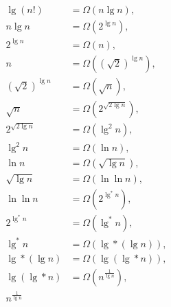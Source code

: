 \begin{align*}
	\lg (n!)  &= \Omega \left(n \lg n \right), \\
	n \lg n &= \Omega \left(2^{\lg n} \right), \\
	2^{\lg n} &= \Omega \left(n \right), \\
	n &= \Omega \left(\left( \sqrt{2} \right)^{\lg n} \right), \\
	\left( \sqrt{2} \right)^{\lg n} &= \Omega \left(\sqrt{n} \right), \\
	\sqrt{n} &= \Omega \left(2^{\sqrt{2 \lg n}} \right), \\
	2^{\sqrt{2 \lg n}} &= \Omega \left(\lg ^2 n \right), \\
	\lg ^2 n &= \Omega \left(\ln n \right), \\
	\ln n &= \Omega \left(\sqrt{\lg n} \right), \\
	\sqrt{\lg n} &= \Omega \left(\ln \ln n \right), \\
	\ln \ln n &= \Omega \left(2^{\lg ^* n} \right), \\
	2^{\lg ^* n} &= \Omega \left(\lg ^* n \right), \\
	\lg ^* n &= \Omega \left(\lg * (\lg n) \right), \\
	\lg * (\lg n) &= \Omega \left(\lg (\lg * n) \right), \\
	\lg (\lg * n) &= \Omega \left(n^{\frac{1}{\lg n}} \right), \\
	n^{\frac{1}{\lg n}}
\end{align*}


